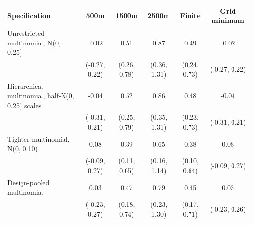\begin{tabular}{lccccc}
\toprule
Specification & 500m & 1500m & 2500m & Finite & Grid minimum \\
\midrule
Unrestricted multinomial, N(0, 0.25) & -0.02 & 0.51 & 0.87 & 0.49 & -0.02 \\
 & (-0.27, 0.22) & (0.26, 0.78) & (0.36, 1.31) & (0.24, 0.73) & (-0.27, 0.22) \\
Hierarchical multinomial, half-N(0, 0.25) scales & -0.04 & 0.52 & 0.86 & 0.48 & -0.04 \\
 & (-0.31, 0.21) & (0.25, 0.79) & (0.35, 1.31) & (0.23, 0.73) & (-0.31, 0.21) \\
Tighter multinomial, N(0, 0.10) & 0.08 & 0.39 & 0.65 & 0.38 & 0.08 \\
 & (-0.09, 0.27) & (0.11, 0.65) & (0.16, 1.14) & (0.10, 0.64) & (-0.09, 0.27) \\
Design-pooled multinomial & 0.03 & 0.47 & 0.79 & 0.45 & 0.03 \\
 & (-0.23, 0.27) & (0.18, 0.74) & (0.23, 1.30) & (0.17, 0.71) & (-0.23, 0.26) \\
\bottomrule
\end{tabular}

